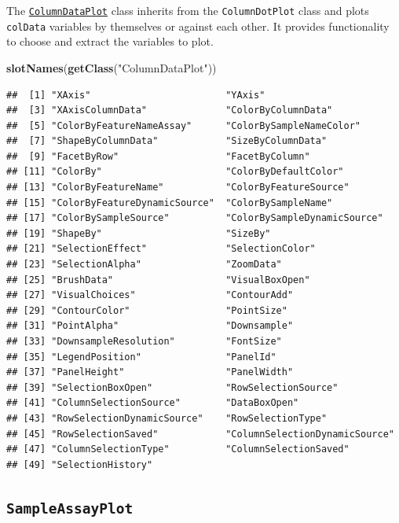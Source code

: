 \documentclass[
]{book}
\newenvironment{Shaded}{\begin{snugshade}}{\end{snugshade}}
\newcommand{\KeywordTok}[1]{\textcolor[rgb]{0.13,0.29,0.53}{\textbf{#1}}}
\newcommand{\NormalTok}[1]{#1}
\newcommand{\StringTok}[1]{\textcolor[rgb]{0.31,0.60,0.02}{#1}}
\begin{document}
The \href{https://isee.github.io/iSEE/reference/ColumnDataPlot-class.html}{\texttt{ColumnDataPlot}} class inherits from the \texttt{ColumnDotPlot} class and plots \texttt{colData} variables by themselves or against each other.
It provides functionality to choose and extract the variables to plot.

\begin{Shaded}
\begin{Highlighting}[]
\KeywordTok{slotNames}\NormalTok{(}\KeywordTok{getClass}\NormalTok{(}\StringTok{"ColumnDataPlot"}\NormalTok{))}
\end{Highlighting}
\end{Shaded}

\begin{verbatim}
##  [1] "XAxis"                        "YAxis"                       
##  [3] "XAxisColumnData"              "ColorByColumnData"           
##  [5] "ColorByFeatureNameAssay"      "ColorBySampleNameColor"      
##  [7] "ShapeByColumnData"            "SizeByColumnData"            
##  [9] "FacetByRow"                   "FacetByColumn"               
## [11] "ColorBy"                      "ColorByDefaultColor"         
## [13] "ColorByFeatureName"           "ColorByFeatureSource"        
## [15] "ColorByFeatureDynamicSource"  "ColorBySampleName"           
## [17] "ColorBySampleSource"          "ColorBySampleDynamicSource"  
## [19] "ShapeBy"                      "SizeBy"                      
## [21] "SelectionEffect"              "SelectionColor"              
## [23] "SelectionAlpha"               "ZoomData"                    
## [25] "BrushData"                    "VisualBoxOpen"               
## [27] "VisualChoices"                "ContourAdd"                  
## [29] "ContourColor"                 "PointSize"                   
## [31] "PointAlpha"                   "Downsample"                  
## [33] "DownsampleResolution"         "FontSize"                    
## [35] "LegendPosition"               "PanelId"                     
## [37] "PanelHeight"                  "PanelWidth"                  
## [39] "SelectionBoxOpen"             "RowSelectionSource"          
## [41] "ColumnSelectionSource"        "DataBoxOpen"                 
## [43] "RowSelectionDynamicSource"    "RowSelectionType"            
## [45] "RowSelectionSaved"            "ColumnSelectionDynamicSource"
## [47] "ColumnSelectionType"          "ColumnSelectionSaved"        
## [49] "SelectionHistory"
\end{verbatim}

\hypertarget{sampleassayplot}{%
\subsection{\texorpdfstring{\texttt{SampleAssayPlot}}{SampleAssayPlot}}\label{sampleassayplot}}
\end{document}
